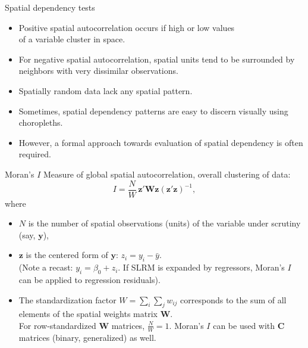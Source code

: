 \documentclass{beamer}
\begin{document}
\begin{frame}{Spatial dependency tests}
\begin{itemize}
    \item Positive spatial autocorrelation occurs if high or low values \\of a variable cluster in space. 
    \medskip
    \item For negative spatial autocorrelation, spatial units tend to be surrounded by neighbors with very dissimilar observations. 
    \medskip
    \item Spatially random data lack any spatial pattern.
    \medskip
    \item Sometimes, spatial dependency patterns are easy to discern visually using choropleths. 
    \medskip
    \item However, a formal approach towards evaluation of spatial dependency is often required.
\end{itemize}
\end{frame}
\begin{frame}{Moran's $I$}
Measure of global spatial autocorrelation, overall clustering of data:
\begin{equation*}
I = \frac{N}{W}\,\bm{z}'\bm{Wz}(\bm{z}'\bm{z})^{-1},
\end{equation*}     
where 
\begin{itemize}
    \item[] $N$ is the number of spatial observations (units) of the variable under scrutiny (say, $\bm{y}$),
    \smallskip
    \item[] $\bm{z}$ is the centered form of $\bm{y}$: $z_i = y_i - \bar{y}$.\\
    (Note a recast: $y_i = \beta_0 + z_i$. If SLRM is expanded by regressors, Moran's $I$ can be applied to regression residuals).
    \smallskip
    \item[] The standardization factor $W = \sum_{i}\sum_{j}w_{ij}$ corresponds to the sum of all elements of the spatial weights matrix $\bm{W}$. \\For row-standardized $\bm{W}$ matrices, $\tfrac{N}{W}=1$. Moran's $I$ can be used with $\bm{C}$ matrices (binary, generalized) as well.
\end{itemize}
\end{frame}
\end{document}
